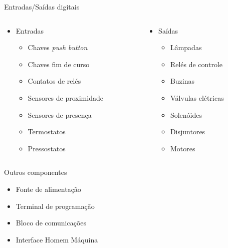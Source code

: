 \documentclass[aspectratio=169,
				xcolor=table]{beamer}
\begin{document}
	\begin{frame}{Entradas/Saídas digitais}
		\begin{columns}
			\begin{column}{0.5\textwidth}
				\begin{itemize}
					\item Entradas
					\begin{itemize}
						\item Chaves \textit{push button}
						\item Chaves fim de curso
						\item Contatos de relés
						\item Sensores de proximidade 
						\item Sensores de presença
						\item Termostatos
						\item Pressostatos
					\end{itemize}
					
				\end{itemize}
			\end{column}
			\begin{column}{0.5\textwidth}
				\begin{itemize}
					\item Saídas
					\begin{itemize}
						\item Lâmpadas
						\item Relés de controle
						\item Buzinas
						\item Válvulas elétricas 
						\item Solenóides
						\item Disjuntores
						\item Motores
					\end{itemize}
					
				\end{itemize}
			\end{column}
		\end{columns}
	\end{frame}
	
	\begin{frame}{Outros componentes}
		\begin{itemize}
			\item Fonte de alimentação
			\vspace{1em}
			\item Terminal de programação
			\vspace{1em}
			\item Bloco de comunicações
			\vspace{1em}
			\item Interface Homem Máquina

		\end{itemize}
	\end{frame}
	
\end{document}
